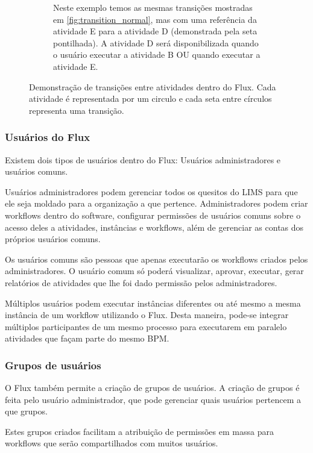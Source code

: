 \begin{figure}
\begin{subfigure}[b]{0.45\textwidth}
        \caption{Neste exemplo temos as mesmas transições mostradas em \ref{fig:transition_normal}, mas com uma referência da atividade E para a atividade D (demonstrada pela seta pontilhada). A atividade D será disponibilizada quando o usuário executar a atividade B OU quando executar a atividade E.}
        \label{fig:transition_ref}
    \end{subfigure}
    \caption{Demonstração de transições entre atividades dentro do Flux. Cada atividade é representada por um circulo e cada seta entre círculos representa uma transição.}
    \label{fig:transitions}
\end{figure}

\subsubsection{Usuários do Flux}

Existem dois tipos de usuários dentro do Flux: Usuários administradores e usuários comuns.

Usuários administradores podem gerenciar todos os quesitos do LIMS para que ele seja moldado para a organização a que pertence. Administradores podem criar workflows dentro do software, configurar permissões de usuários comuns sobre o acesso deles a atividades, instâncias e workflows, além de gerenciar as contas dos próprios usuários comuns.

Os usuários comuns são pessoas que apenas executarão os workflows criados pelos administradores. O usuário comum só poderá visualizar, aprovar, executar, gerar relatórios de atividades que lhe foi dado permissão pelos administradores.

Múltiplos usuários podem executar instâncias diferentes ou até mesmo a mesma instância de um workflow utilizando o Flux. Desta maneira, pode-se integrar múltiplos participantes de um mesmo processo para executarem em paralelo atividades que façam parte do mesmo BPM.

\subsubsection{Grupos de usuários}

O Flux também permite a criação de grupos de usuários. A criação de grupos é feita pelo usuário administrador, que pode gerenciar quais usuários pertencem a que grupos.

Estes grupos criados facilitam a atribuição de permissões em massa para workflows que serão compartilhados com muitos usuários.

